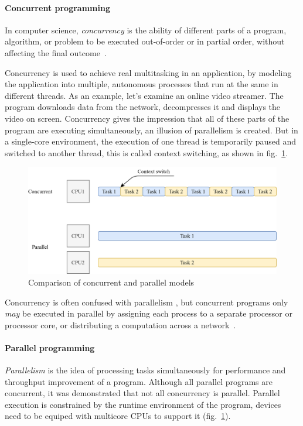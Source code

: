 \paragraph{Concurrent programming\newline}
In computer science, \emph{concurrency} is the ability of different parts of a program, algorithm, or problem to be executed out-of-order or in partial order, without affecting the final outcome~\cite{lamport1978time}.

Concurrency is used to achieve real multitasking in an application, by modeling the application into multiple, autonomous processes that run at the same in different threads.
As an example, let's examine an online video streamer. The program downloads data from the network, decompresses it and displays the video on screen.
Concurrency gives the impression that all of these parts of the program are executing simultaneously, an illusion of parallelism is created. 
But in a single-core environment, the execution of one thread is temporarily paused and switched to another thread, this is called context switching, as shown in fig.~\ref{fig:convspar}.
\begin{figure}[htb]
	\centering
		\includegraphics[scale=1.0]{figures02/convspar.png}
	\caption{Comparison of concurrent and parallel models}
	\label{fig:convspar}
\end{figure}

Concurrency is often confused with parallelism \cite{waza}, but concurrent programs only \emph{may} be executed in parallel 
by assigning each process to a separate processor or processor core, or distributing a computation across a network~\cite{mordechai}.

\paragraph{Parallel programming\newline}
\emph{Parallelism} is the idea of processing tasks simultaneously for performance and throughput improvement of a program. Although all parallel programs are concurrent, it was demonstrated that not all concurrency is parallel.
Parallel execution is constrained by the runtime environment of the program, devices need to be equiped with multicore CPUs to support it (fig.~\ref{fig:convspar}).

